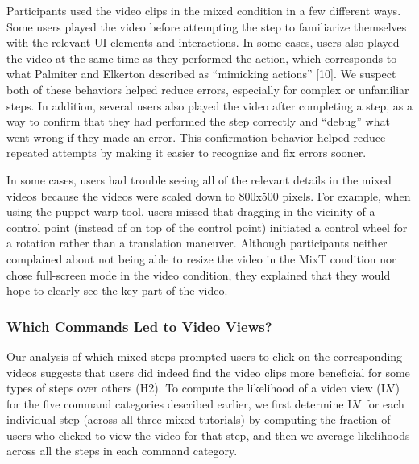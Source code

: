 Participants used the video clips in the mixed condition in a few different ways. Some users played the video before attempting the step to familiarize themselves with the relevant UI elements and interactions. In some cases, users also played the video at the same time as they performed the action, which corresponds to what Palmiter and Elkerton described as “mimicking actions” [10]. We suspect both of these behaviors helped reduce errors, especially for complex or unfamiliar steps. In addition, several users also played the video after completing a step, as a way to confirm that they had performed the step correctly and “debug” what went wrong if they made an error. This confirmation behavior helped reduce repeated attempts by making it easier to recognize and fix errors sooner.

In some cases, users had trouble seeing all of the relevant details in the mixed videos because the videos were scaled down to 800x500 pixels. For example, when using the puppet warp tool, users missed that dragging in the vicinity of a control point (instead of on top of the control point) initiated a control wheel for a rotation rather than a translation maneuver. Although participants neither complained about not being able to resize the video in the MixT condition nor chose full-screen mode in the video condition, they explained that they would hope to clearly see the key part of the video.

\subsubsection{Which Commands Led to Video Views?}
Our analysis of which mixed steps prompted users to click on the corresponding videos suggests that users did indeed find the video clips more beneficial for some types of steps over others (H2). To compute the likelihood of a video view (LV) for the five command categories described earlier, we first determine LV for each individual step (across all three mixed tutorials) by computing the fraction of users who clicked to view the video for that step, and then we average likelihoods across all the steps in each command category.

